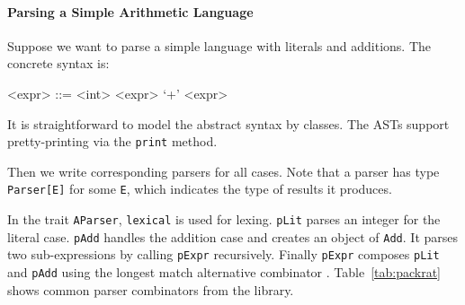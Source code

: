 \paragraph{Parsing a Simple Arithmetic Language}
Suppose we want to parse a simple language with literals and
additions. The concrete syntax is:

\setlength{\grammarindent}{5em}
\begin{grammar}
<expr> ::= <int>
    \alt <expr> `+' <expr>
\end{grammar}

It is straightforward to model the abstract syntax by classes. The ASTs support pretty-printing via the \lstinline{print} method.

\vspace{-4pt}
\vspace{-4pt}

Then we write corresponding parsers for all cases.
Note that a parser has type \lstinline{Parser[E]} for some
\lstinline{E}, which indicates the type of results it produces.

\vspace{-4pt}
\vspace{-4pt}

In the trait \lstinline{AParser}, \lstinline{lexical} is used for lexing. \lstinline{pLit} parses an integer for the literal case.
\lstinline{pAdd} handles the addition case and creates an object of \lstinline{Add}. It parses two sub-expressions by calling \lstinline{pExpr}
recursively. Finally \lstinline{pExpr} composes \lstinline{pLit} and \lstinline{pAdd} using the longest match alternative combinator \inlinecode{|||}.
Table~\ref{tab:packrat} shows common parser combinators from the library.

